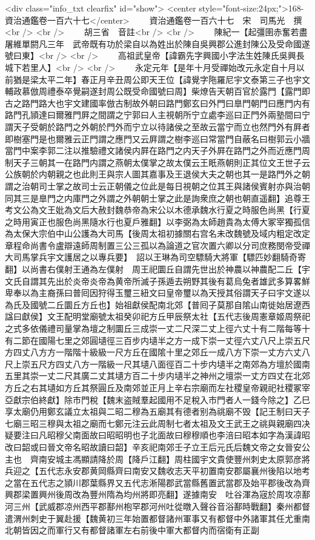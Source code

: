 <div class="info_txt clearfix" id="show">
<center style="font-size:24px;">168-資治通鑑卷一百六十七</center>
  　　資治通鑑卷一百六十七　宋　司馬光　撰<br />
<br />
　　胡三省　音註<br />
<br />
　　陳紀一【起彊圉赤奮若盡屠維單閼凡三年　武帝既有功於梁自以為姓出於陳自吳興郡公進封陳公及受命國遂號曰東】<br />
<br />
　　高祖武皇帝【諱霸先字興國小字法生姓陳氏吳興長城下若里人】<br />
<br />
　　永定元年【是年十月受禪始改元永定自十月以前猶是梁太平二年】春正月辛丑周公即天王位【諱覺字陁羅尼宇文泰第三子也宇文輔政慕倣周禮泰卒覺嗣遂封周公既受命國號曰周】柴燎告天朝百官於露門【露門即古之路門路大也宇文建國率倣古制故外朝曰路門鄭玄曰外門曰臯門朝門曰應門内有路門孔頴達曰爾雅門屛之間謂之宁郭曰人主視朝所宁立處李巡曰正門外兩塾間曰宁謂天子受朝於路門之外朝於門外而宁立以待諸侯之至故云當宁而立也然門外有屛者即樹塞門是也爾雅云正門謂之應門又云屛謂之樹李巡曰常當門自蔽名曰樹郭云小牆當門中案李郭二注以推驗禮文諸侯内屛在路門之内天子外屛在路門之外而近應門周制天子三朝其一在路門内謂之燕朝太僕掌之故太僕云王眂燕朝則正其位文王世子云公族朝於内朝親之也此則王與宗人圖其嘉事及王退侯大夫之朝也其一是路門外之朝謂之治朝司士掌之故司士云正朝儀之位此是每日視朝之位其王與諸侯賓射亦與治朝同其三是臯門之内庫門之外謂之外朝朝士掌之此是詢衆庶之朝也朝直遥翻】追尊王考文公為文王妣為文后大赦封魏恭帝為宋公以木德承魏水行夏之時服色尚黑【行夏之時用寅正也服色尚黑隨水行也夏戶雅翻】以李弼為太師趙貴為太傅大冢宰獨孤信為太保大宗伯中山公護為大司馬【後周太祖初據關右宫名未改魏號及域内粗定改定章程命尚書令盧辯遠師周制置三公三孤以為論道之官次置六卿以分司庶務閔帝受禪大司馬掌兵宇文護居之以專兵要】　詔以王琳為司空驃騎大將軍【驃匹妙翻騎奇寄翻】以尚書右僕射王通為左僕射　周王祀圜丘自謂先世出於神農以神農配二丘【宇文氏自謂其先出於炎帝炎帝為黄帝所滅子孫遁去朔野其後有葛烏兔者雄武多算畧鮮卑奉以為主裔孫曰普囘因狩得玉璽三紐文曰皇帝璽以為天授其俗謂天子曰宇文遂以為氏及國號二丘圜丘方丘也】始祖獻侯配南北郊【普囘子莫那自隂山南徙始居遼西諡曰獻侯】文王配明堂廟號太祖癸卯祀方丘甲辰祭太社【五代志後周憲章姬周祭祀之式多依儀禮司量掌為壇之制圜丘三成崇一丈二尺深二丈上徑六丈十有二階每等十有二節在國陽七里之郊圓壝徑三百步内壝半之方一成下崇一丈徑六丈八尺上崇五尺方四丈八方方一階階十級級一尺方丘在國隂十里之郊丘一成八方下崇一丈方六丈八尺上崇五尺方四丈八方一階級一尺其壝八面徑百二十步内壝半之南郊為方壇於國南五里其崇一丈二尺其廣二丈其壝方百二十步内壝半之神州之壇崇一丈方四丈在北郊方丘之右其壝如方丘其祭圓丘及南郊並正月上辛右宗廟而左社稷皇帝親祀社稷冢宰亞獻宗伯終獻】除市門稅【魏末盗賊羣起國用不足稅入市門者人一錢今除之】乙巳享太廟仍用鄭玄議立太祖與二昭二穆為五廟其有德者别為祧廟不毁【記王制曰天子七廟三昭三穆與太祖之廟而七鄭元注云此周制七者太祖及文王武王之祧與親廟四决疑要注曰凡昭穆父南面故曰昭昭明也子北面故曰穆穆順也李涪曰昭本如字為漢諱昭改曰韶或曰晉文帝名昭故讀曰韶】辛亥祀南郊壬子立王后元氏后魏文帝之女晉安公主也　齊南安城主馮顯請降於周【降戶江翻】周柱國宇文貴使豐州刺史太原郭彦將兵迎之【五代志永安郡黄岡縣齊曰南安又魏收志天平初置南安郡屬襄州後陷以地考之當在五代志之頴川郡葉縣界又五代志淅陽郡武當縣舊置武當郡及始平郡後改為齊興郡梁置興州後周改為豐州隋為均州將即亮翻】遂據南安　吐谷渾為宼於周攻凉鄯河三州【武威郡凉州西平郡鄯州枹罕郡河州吐從暾入聲谷音浴鄯時戰翻】秦州都督遣渭州刺史于翼赴援【魏黄初三年始置都督諸州軍事又有都督中外諸軍其任尤重南北朝皆因之而軍行又有都督諸軍左右前後中軍大都督内而宿衛有正副